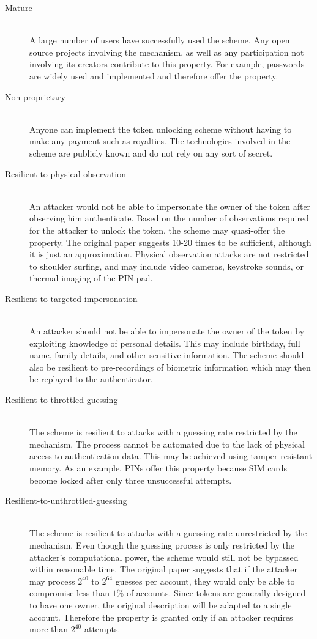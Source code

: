 \begin{description}
  \item[Mature] \hfill \\
  A large number of users have successfully used the scheme. Any open source projects involving the mechanism, as well as any participation not involving its creators contribute to this property. For example, passwords are widely used and implemented and therefore offer the property.
  
  \item[Non-proprietary] \hfill \\
  Anyone can implement the token unlocking scheme without having to make any payment such as royalties. The technologies involved in the scheme are publicly known and do not rely on any sort of secret.
  
  \item[Resilient-to-physical-observation] \hfill \\
  An attacker would not be able to impersonate the owner of the token after observing him authenticate. Based on the number of observations required for the attacker to unlock the token, the scheme may quasi-offer the property. The original paper suggests 10-20 times to be sufficient, although it is just an approximation. Physical observation attacks are not restricted to shoulder surfing, and may include video cameras, keystroke sounds, or thermal imaging of the PIN pad.
  
  \item[Resilient-to-targeted-impersonation] \hfill \\
  An attacker should not be able to impersonate the owner of the token by exploiting knowledge of personal details. This may include birthday, full name, family details, and other sensitive information. The scheme should also be resilient to pre-recordings of biometric information which may then be replayed to the authenticator.
  
  \item[Resilient-to-throttled-guessing] \hfill \\
  The scheme is resilient to attacks with a guessing rate restricted by the mechanism. The process cannot be automated due to the lack of physical access to authentication data. This may be achieved using tamper resistant memory. As an example, PINs offer this property because SIM cards become locked after only three unsuccessful attempts.
  
  \item[Resilient-to-unthrottled-guessing] \hfill \\
  The scheme is resilient to attacks with a guessing rate unrestricted by the mechanism. Even though the guessing process is only restricted by the attacker's computational power, the scheme would still not be bypassed within reasonable time. The original paper suggests that if the attacker may process $2^{40}$ to $2^{64}$ guesses per account, they would only be able to compromise less than $1\%$ of accounts. Since tokens are generally designed to have one owner, the original description will be adapted to a single account. Therefore the property is granted only if an attacker requires more than $2^{40}$ attempts.
  

\end{description}
